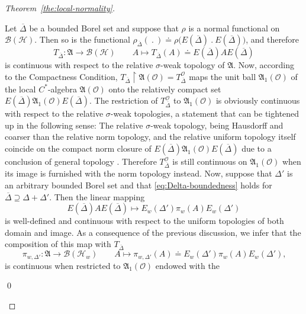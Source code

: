 \documentclass[a4paper,a4paper]{article}
\numberwithin{equation}{section}
\newcommand{\Afrak}{\mathfrak{A}}
\newcommand{\Oscr}{\mathscr{O}}
\newcommand{\Deltabar}{\overline{\Delta}}
\newcommand{\BH}{\mathscr{B} ( \mathscr{H} )}
\newcommand{\BHw}{\mathscr{B} ( \mathscr{H}_w )}
\newcommand{\EDbar}{E ( \overline{\Delta} )}
\newcommand{\EwDprime}{E_w ( \Delta' )}
\newcommand{\AO}{\mathfrak{A} ( \mathscr{O} )}
\newcommand{\AoneO}{\mathfrak{A}_1 ( \mathscr{O} )}
\newcommand{\piwDprime}{\pi_{w , \Delta'}}
\newcommand{\TODbar}{T_{\overline{\Delta}}^\Oscr}
\newcounter{proofitem}
\newenvironment{prooflist}{\begin{list}{(\roman{proofitem})}%
  {\usecounter{proofitem} \setlength{\topsep}{0ex}%
   \setlength{\parsep}{0.2ex} \setlength{\itemsep}{0.4ex}%
   \setlength{\leftmargin}{0em} \setlength{\itemindent}{0.5em}%
   \setlength{\listparindent}{1em}}}{\qed \end{list}}
\theoremstyle{definition}
\theoremstyle{plain}
\theoremstyle{remark}
\theoremstyle{assumption}
\begin{document}
  \begin{proof}[Theorem~\ref{the:local-normality}]
    \begin{prooflist}
    \item Let $\Deltabar$ be a bounded Borel set and suppose that
      $\rho$ is a normal functional on $\BH$. Then so is the
      functional $\rho_{\Deltabar} (~.~) \doteq \rho \bigl(
      \EDbar~.~\EDbar \bigr)$, and therefore
      \begin{equation*}
        T_{\Deltabar} : \Afrak \rightarrow \BH \qquad A \mapsto
        T_{\Deltabar} ( A ) \doteq \EDbar A \EDbar
      \end{equation*}
      is continuous with respect to the relative $\sigma$-weak
      topology of $\Afrak$. Now, according to the Compactness
      Condition, $T_{\Deltabar} \restriction \AO = \TODbar$ maps the
      unit ball $\AoneO$ of the local $C^*$-algebra $\AO$ onto the
      relatively compact set $\EDbar \AoneO \EDbar$. The restriction
      of $\TODbar$ to $\AoneO$ is obviously continuous with respect to
      the relative $\sigma$-weak topologies, a statement that can be
      tightened up in the following sense: The relative $\sigma$-weak
      topology, being Hausdorff and coarser than the relative norm
      topology, and the relative uniform topology itself coincide on
      the compact norm closure of $\EDbar \AoneO \EDbar$ due to a
      conclusion of general topology \cite[Chapter One,
      \S\,3,\,2.(6)]{koethe:1983}. Therefore $\TODbar$ is still
      continuous on $\AoneO$ when its image is furnished with the norm
      topology instead. Now, suppose that $\Delta'$ is an arbitrary
      bounded Borel set and that \eqref{eq:Delta-boundedness} holds
      for $\Deltabar \supseteq \Delta + \Delta'$. Then the linear
      mapping
      \begin{equation}
        \label{eq:sandwich-mapping}
        \EDbar A \EDbar \mapsto \EwDprime \pi_w ( A ) \EwDprime
      \end{equation}
      is well-defined and continuous with respect to the uniform
      topologies of both domain and image. As a consequence of the
      previous discussion, we infer that the composition of this map
      with $T_{\Deltabar}$
      \begin{equation}
        \label{eq:sandwich-representation}
        \piwDprime : \Afrak \rightarrow \BHw \qquad A \mapsto
        \piwDprime ( A ) \doteq \EwDprime \pi_w ( A ) \EwDprime
        \text{,}
      \end{equation}
      is continuous when restricted to $\AoneO$ endowed with the

\end{prooflist}
\end{proof}
\end{document}
